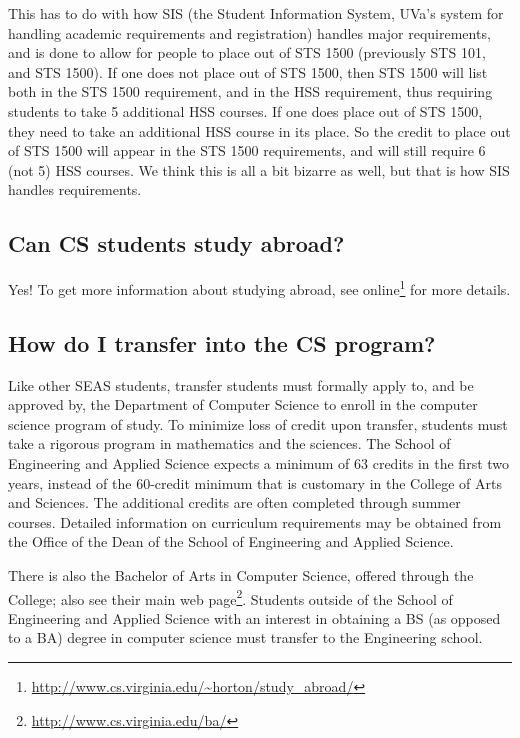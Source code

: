 \documentclass[10pt,letter]{book}
\newcommand{\myurl}[1]{\footnote{\scriptsize\url{#1}}}
\begin{document}
This has to do with how SIS (the Student Information System, UVa's
system for handling academic requirements and registration) handles
major requirements, and is done to allow for people to place out of
STS 1500 (previously STS 101, and STS 1500). If one does not
place out of STS 1500, then STS 1500 will list both in the STS 1500
requirement, and in the HSS requirement, thus requiring students to
take 5 additional HSS courses. If one does place out of STS 1500, they
need to take an additional HSS course in its place. So the credit to
place out of STS 1500 will appear in the STS 1500 requirements, and
will still require 6 (not 5) HSS courses. We think this is all a bit
bizarre as well, but that is how SIS handles requirements.


\subsection{Can CS students study abroad?}

Yes! To get more information about studying abroad, see
online\myurl{http://www.cs.virginia.edu/~horton/study_abroad/}
for more details.
 
\subsection{How do I transfer into the CS program?}

Like other SEAS students, transfer students must formally apply to,
and be approved by, the Department of Computer Science to enroll in
the computer science program of study. To minimize loss of credit upon
transfer, students must take a rigorous program in mathematics and the
sciences. The School of Engineering and Applied Science expects a
minimum of 63 credits in the first two years, instead of the 60-credit
minimum that is customary in the College of Arts and Sciences. The
additional credits are often completed through summer
courses. Detailed information on curriculum requirements may be
obtained from the Office of the Dean of the School of Engineering and
Applied Science.

There is also the Bachelor of Arts in Computer Science, offered
through the College; also see their main
web page\myurl{http://www.cs.virginia.edu/ba/}. Students
outside of the School of Engineering and Applied Science with an
interest in obtaining a BS (as opposed to a BA) degree in computer
science must transfer to the Engineering school.
\end{document}
